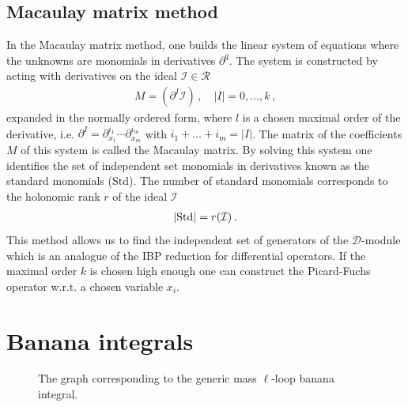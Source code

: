 \documentclass[11pt]{article}
\begin{document}
%
%
%


\subsection{Macaulay matrix method}
In the Macaulay matrix method, one builds the linear system of equations where the unknowns are monomials in derivatives $\partial^{q}$. The system is constructed by acting with derivatives on the ideal $\mathcal{I} \in \mathcal{R}$ 
\begin{align}
M = (\partial^{I} \mathcal{I}) \,, \quad \vert I \vert = 0,\hdots, k \,,  
\end{align}
expanded in the normally ordered form, where $l$ is a chosen maximal order of the derivative, i.e. $\partial^{I}= \partial_{x_{1}}^{i_{1}}\cdots \partial_{x_{m}}^{i_{m}}$ with $i_{1} + \hdots + i_{m} = \vert I \vert$. The matrix of the coefficients $M$ of this system is called the Macaulay matrix. By solving this system one identifies the set of independent set monomials in derivatives known as the standard monomials (Std). The number of standard monomials corresponds to the holonomic rank $r$ of the ideal $\mathcal{I}$ 
\begin{align}
\vert {\rm Std} \vert = r(\mathcal{I}) \,.    
\end{align}
This method allows us to find the independent set of generators of the $\mathcal{D}$-module which is an analogue of the IBP reduction for differential operators. If the maximal order $k$ is chosen high enough one can construct the Picard-Fuchs operator w.r.t. a chosen variable $x_{i}$. 


%
%
%


\section{Banana integrals}\label{sec:banana}

\begin{figure}[t]
\centering
{}
\caption{The graph corresponding to the generic mass $\ell$-loop banana integral.}
\label{fig:banana}
\end{figure}
\end{document}
